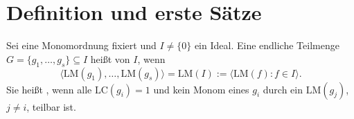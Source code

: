 \section{Definition und erste Sätze}

\begin{definition}
Sei eine Monomordnung fixiert und $I\ne\{0\}$ ein Ideal. Eine endliche Teilmenge $G = \{g_1, \ldots, g_s\}\subseteq I$ heißt  von $I$, wenn
\[ \langle\mathrm{LM}(g_1), \ldots, \mathrm{LM}(g_s)\rangle = \mathrm{LM}(I) := \langle\mathrm{LM}(f) : f\in I\rangle . \]
Sie heißt , wenn alle $\mathrm{LC}(g_i) = 1$ und kein Monom eines $g_i$ durch ein $\mathrm{LM}(g_j)$, $j\ne i$, teilbar ist.
\end{definition}

